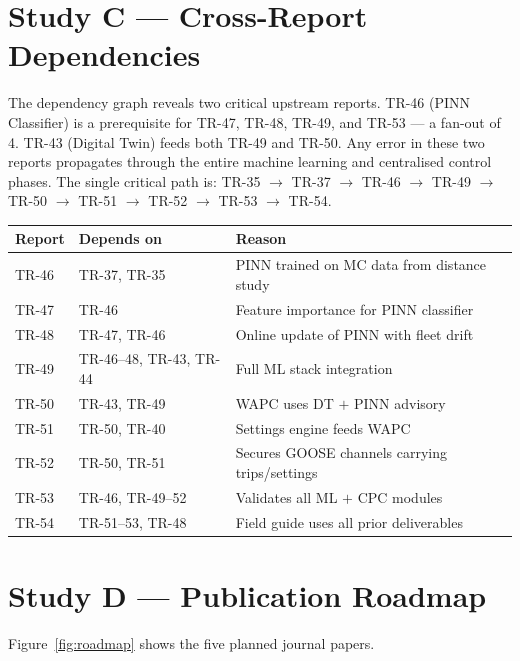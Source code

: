 \documentclass[11pt,a4paper]{article}
\begin{document}
\section{Study C --- Cross-Report Dependencies}
\label{sec:studyC}

The dependency graph reveals two critical upstream reports.  TR-46
(PINN Classifier) is a prerequisite for TR-47, TR-48, TR-49, and
TR-53 --- a fan-out of 4.  TR-43 (Digital Twin) feeds both TR-49 and
TR-50.  Any error in these two reports propagates through the entire
machine learning and centralised control phases.  The single critical
path is: TR-35 $\to$ TR-37 $\to$ TR-46 $\to$ TR-49 $\to$ TR-50 $\to$
TR-51 $\to$ TR-52 $\to$ TR-53 $\to$ TR-54.

\begin{center}
\begin{tabular}{@{}llp{7cm}@{}}
\toprule
Report & Depends on & Reason \\
\midrule
TR-46 & TR-37, TR-35     & PINN trained on MC data from distance study \\
TR-47 & TR-46            & Feature importance for PINN classifier \\
TR-48 & TR-47, TR-46     & Online update of PINN with fleet drift \\
TR-49 & TR-46--48, TR-43, TR-44 & Full ML stack integration \\
TR-50 & TR-43, TR-49     & WAPC uses DT $+$ PINN advisory \\
TR-51 & TR-50, TR-40     & Settings engine feeds WAPC \\
TR-52 & TR-50, TR-51     & Secures GOOSE channels carrying trips/settings \\
TR-53 & TR-46, TR-49--52 & Validates all ML $+$ CPC modules \\
TR-54 & TR-51--53, TR-48 & Field guide uses all prior deliverables \\
\bottomrule
\end{tabular}
\end{center}

\section{Study D --- Publication Roadmap}
\label{sec:studyD}

Figure~\ref{fig:roadmap} shows the five planned journal papers.
\end{document}
